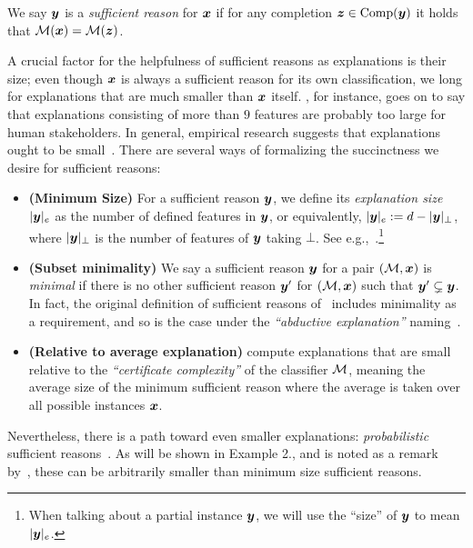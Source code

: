 \begin{definition}
	We say ${\bm{y}}$ is a \emph{sufficient reason} for ${\bm{x}}$ if for any completion ${\bm{z}} \in \operatorname{Comp}({\bm{y}})$ it holds that $\mathcal{M}({\bm{x}}) = \mathcal{M}({\bm{z}})$.
	\label{def:sufficient-reason}
\end{definition}
A crucial factor for the helpfulness of sufficient reasons as explanations is their size; even though ${\bm{x}}$ is always a sufficient reason for its own classification, we long for explanations that are much smaller than ${\bm{x}}$ itself. \citet{millerMagicalNumberSeven1956}, for instance, goes on to say that explanations consisting of more than $9$ features are probably too large for human stakeholders. In general, empirical research suggests that explanations ought to be small~\cite{Narayanan_Chen_He_Kim_Gershman_Doshi-Velez_2018, Lage_Chen_He_Narayanan_Kim_Gershman_Doshi-Velez_2019}.
There are several ways of formalizing the succinctness we desire for sufficient reasons:

\begin{itemize}
    \item \textbf{(Minimum Size)} For a sufficient reason ${\bm{y}}$, we define its \emph{explanation size} $|{\bm{y}}|_e$ as the number of defined features in ${\bm{y}}$, or equivalently, $|{\bm{y}}|_e := d - |{\bm{y}}|_\bot$, where $|{\bm{y}}|_\bot$ is the number of features of ${\bm{y}}$ taking $\bot$. See e.g.,~\cite{NEURIPS2020_b1adda14}.\footnote{When talking about a partial instance ${\bm{y}}$, we will use the ``size'' of ${\bm{y}}$ to mean $|{\bm{y}}|_e$.}
    \item \textbf{(Subset minimality)} We say a sufficient reason ${\bm{y}}$ for a pair $(\mathcal{M}, {\bm{x}})$ is \emph{minimal} if there is no other sufficient reason ${\bm{y}}'$ for $(\mathcal{M}, {\bm{x}})$ such that ${\bm{y}}' \subsetneq {\bm{y}}$. In fact, the original definition of sufficient reasons of~\citet{Darwiche_Hirth_2020} includes minimality as a requirement, and so is the case under the \emph{``abductive explanation''} naming~\cite{Ignatiev_Narodytska_Asher_Marques-Silva_2021}.
    \item \textbf{(Relative to average explanation)} \citet{blanc2021provably} compute explanations that are small relative to the \emph{``certificate complexity''} of the classifier $\mathcal{M}$, meaning the average size of the minimum sufficient reason where the average is taken over all possible instances ${\bm{x}}$.
\end{itemize}

Nevertheless, there is a path toward even smaller explanations: \emph{probabilistic} sufficient reasons~\cite{Waldchen_MacDonald_Hauch_Kutyniok_2021, Izza_Huang_Ignatiev_Narodytska_Cooper_Marques-Silva_2023}. 
As will be shown in Example 2., and is noted as a remark by~\citet{blanc2021provably}, these can be arbitrarily smaller than minimum size sufficient reasons.

